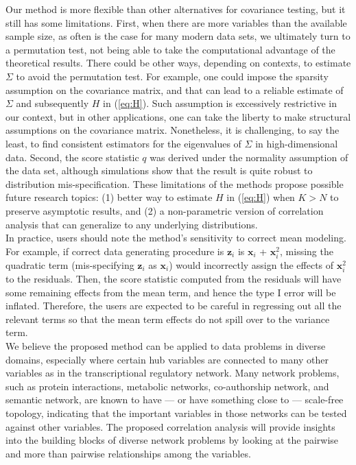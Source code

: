 \documentclass[aap,authoryear, preprint]{imsart}
\numberwithin{equation}{section}
\theoremstyle{plain}
\begin{document}
Our method is more flexible than other alternatives for covariance testing, but it still has some limitations. First, when there are more variables than the available sample size, as often is the case for many modern data sets, we ultimately turn to a permutation test, not being able to take the computational advantage of the theoretical results. There could be other ways, depending on contexts, to estimate $\Sigma$ to avoid the permutation test. For example, one could impose the sparsity assumption on the covariance matrix, and that can lead to a reliable estimate of $\Sigma$ and subsequently $H$ in (\ref{eq:H}). Such assumption is excessively restrictive in our context, but in other applications, one can take the liberty to make structural assumptions on the covariance matrix. Nonetheless, it is challenging, to say the least, to find consistent estimators for the eigenvalues of $\Sigma$ in high-dimensional data. Second, the score statistic $q$ was derived under the normality assumption of the data set, although simulations show that the result is quite robust to distribution mis-specification. These limitations of the methods propose possible future research topics: (1) better way to estimate $H$ in (\ref{eq:H}) when $K > N$ to preserve asymptotic results, and (2) a non-parametric version of correlation analysis that can generalize to any underlying distributions. \\

In practice, users should note the method's sensitivity to correct mean modeling. For example, if correct data generating procedure is $\bm{z}_i$ is $\bm{x}_i$ + $\bm{x}_i^2$, missing the quadratic term (mis-specifying $\bm{z}_i$ as $\bm{x}_i$) would incorrectly assign the effects of $\bm{x}_i^2$ to the residuals. Then, the score statistic computed from the residuals will have some remaining effects from the mean term, and hence the type I error will be inflated. Therefore, the users are expected to be careful in regressing out all the relevant terms so that the mean term effects do not spill over to the variance term.\\ 

We believe the proposed method can be applied to data problems in diverse domains, especially where certain hub variables are connected to many other variables as in the transcriptional regulatory network. Many network problems, such as protein interactions, metabolic networks, co-authorship network, and semantic network, are known to have --- or have something close to --- scale-free topology, indicating that the important variables in those networks can be tested against other variables. The proposed correlation analysis will provide insights into the building blocks of diverse network problems by looking at the pairwise and more than pairwise relationships among the variables.
\end{document}
